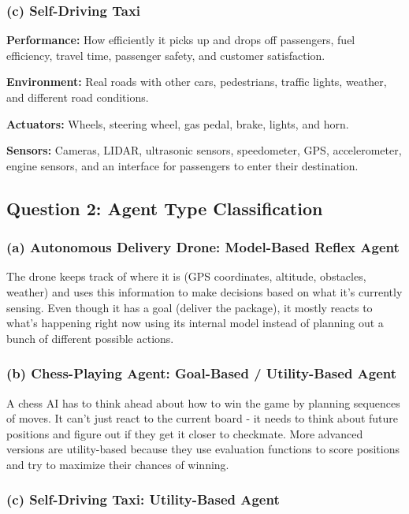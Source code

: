 \documentclass[letterpaper]{article}
\begin{document}
\subsubsection{(c) Self-Driving Taxi}

\textbf{Performance:} How efficiently it picks up and drops off passengers, fuel efficiency, travel time, passenger safety, and customer satisfaction.

\textbf{Environment:} Real roads with other cars, pedestrians, traffic lights, weather, and different road conditions.

\textbf{Actuators:} Wheels, steering wheel, gas pedal, brake, lights, and horn.

\textbf{Sensors:} Cameras, LIDAR, ultrasonic sensors, speedometer, GPS, accelerometer, engine sensors, and an interface for passengers to enter their destination.

\subsection{Question 2: Agent Type Classification}

\subsubsection{(a) Autonomous Delivery Drone: Model-Based Reflex Agent}

The drone keeps track of where it is (GPS coordinates, altitude, obstacles, weather) and uses this information to make decisions based on what it's currently sensing. Even though it has a goal (deliver the package), it mostly reacts to what's happening right now using its internal model instead of planning out a bunch of different possible actions.

\subsubsection{(b) Chess-Playing Agent: Goal-Based / Utility-Based Agent}

A chess AI has to think ahead about how to win the game by planning sequences of moves. It can't just react to the current board - it needs to think about future positions and figure out if they get it closer to checkmate. More advanced versions are utility-based because they use evaluation functions to score positions and try to maximize their chances of winning.

\subsubsection{(c) Self-Driving Taxi: Utility-Based Agent}
\end{document}
